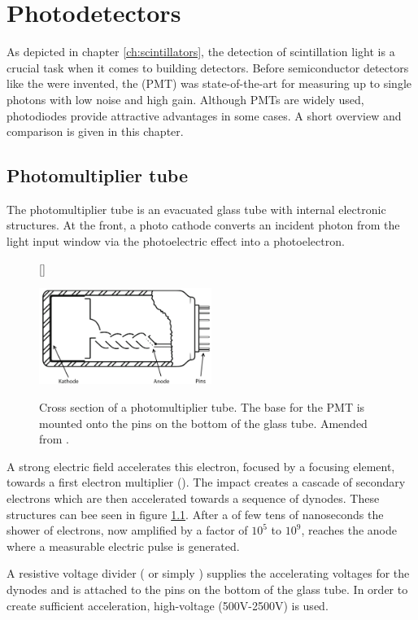 \chapter{Photodetectors} \label{ch:photo_detectors}
As depicted in chapter \ref{ch:scintillators}, the detection of scintillation light is a crucial task when it comes to building detectors. Before semiconductor detectors like the  were invented, the  (PMT) was state-of-the-art for measuring up to single photons with low noise and high gain. Although PMTs are widely used, photodiodes provide attractive advantages in some cases. A short overview and comparison is given in this chapter. 
\section{Photomultiplier tube}
The photomultiplier tube is an evacuated glass tube with internal electronic structures. At the front, a photo cathode converts an incident photon from the light input window via the photoelectric effect into a photoelectron.  
\begin{figure}[b]
	[\FBwidth]
	{\caption[Photomultiplier tube]{Cross section of a photomultiplier tube. The base for the PMT is mounted onto the pins on the bottom of the glass tube. Amended from \cite{wermes}.}   
	\label{fig:ch3:pmts}}
	{\includegraphics[width=0.5\textwidth]{./graphics/ch3/pmt1.png}}
\end{figure}
A strong electric field accelerates this electron, focused by a focusing element, towards a first electron multiplier (). The impact creates a cascade of secondary electrons which are then accelerated towards a sequence of dynodes. These structures can bee seen in figure \ref{fig:ch3:pmts}. After a  of few tens of nanoseconds \cite{moore} the shower of electrons, now amplified by a factor of $10^{5}$ to $10^{9}$, reaches the anode where a measurable electric pulse is generated. \par 
A resistive voltage divider ( or simply ) supplies the accelerating voltages for the dynodes and is attached to the pins on the bottom of the glass tube. In order to create sufficient acceleration, high-voltage (500$\si{\volt}$-2500$\si{\volt}$) is used. \par 
